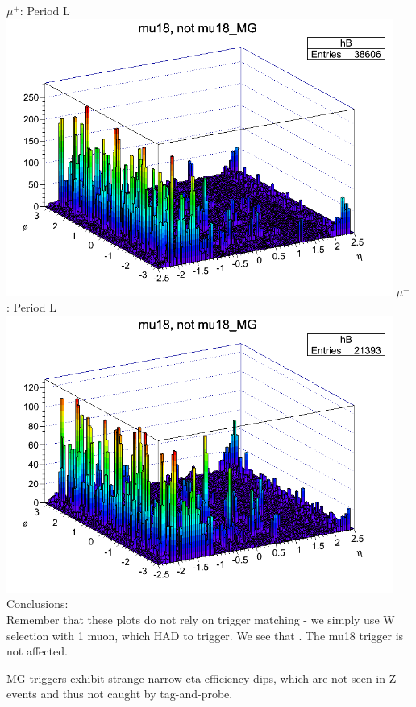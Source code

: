  {
\colb[T]
$\mu^+$: Period L
\centering
\includegraphics[width=0.95\textwidth]{dates/20130306/figures/mu18/dump_MG_dataL_w_POS.dat__MUID_NOT_MG.png}
$\mu^-$: Period L
\centering
\includegraphics[width=0.95\textwidth]{dates/20130306/figures/mu18/dump_MG_dataL_w_NEG.dat__MUID_NOT_MG.png}
\cole
}
 {
  Conclusions: \\
  Remember that these plots do not rely on trigger matching - we simply use W selection with 1 muon, which HAD to trigger.
  We see that . The mu18 trigger is not affected.
}

{
MG triggers exhibit strange narrow-eta efficiency dips, which are not seen in Z events and thus not caught by tag-and-probe.
}

